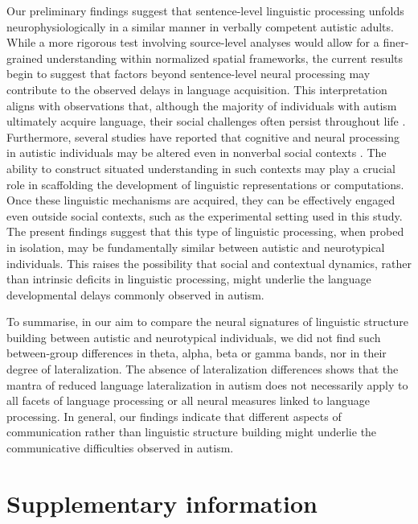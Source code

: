 Our preliminary findings suggest that sentence-level linguistic processing unfolds neurophysiologically in a similar manner in verbally competent autistic adults. While a more rigorous test involving source-level analyses would allow for a finer-grained understanding within normalized spatial frameworks, the current results begin to suggest that factors beyond sentence-level neural processing may contribute to the observed delays in language acquisition. This interpretation aligns with observations that, although the majority of individuals with autism ultimately acquire language, their social challenges often persist throughout life \citep{anderson2007}. Furthermore, several studies have reported that cognitive and neural processing in autistic individuals may be altered even in nonverbal social contexts \citep{mangnus2024bpcnni,wadge2019}. The ability to construct situated understanding in such contexts may play a crucial role in scaffolding the development of linguistic representations or computations. Once these linguistic mechanisms are acquired, they can be effectively engaged even outside social contexts, such as the experimental setting used in this study. The present findings suggest that this type of linguistic processing, when probed in isolation, may be fundamentally similar between autistic and neurotypical individuals. This raises the possibility that social and contextual dynamics, rather than intrinsic deficits in linguistic processing, might underlie the language developmental delays commonly observed in autism. 

To summarise, in our aim to compare the neural signatures of linguistic structure building between autistic and neurotypical individuals, we did not find such between-group differences in theta, alpha, beta or gamma bands, nor in their degree of lateralization. The absence of lateralization differences shows that the mantra of reduced language lateralization in autism does not necessarily apply to all facets of language processing or all neural measures linked to language processing. In general, our findings indicate that different aspects of communication rather than linguistic structure building might underlie the communicative difficulties observed in autism.


\newpage

\section{Supplementary information}

